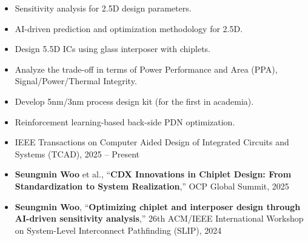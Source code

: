 \documentclass[10pt,letter,ragged2e]{altacv}
\begin{document}
\vspace{-5pt}
\divider
\vspace{-2.5pt}

\begin{itemize}
    \item Sensitivity analysis for 2.5D design parameters.
    \item AI-driven prediction and optimization methodology for 2.5D.
\end{itemize}

\vspace{-5pt}
\divider
\vspace{-2.5pt}

\begin{itemize}
    \item Design 5.5D ICs using glass interposer with chiplets.
    \item Analyze the trade-off in terms of Power Performance and Area (PPA), Signal/Power/Thermal Integrity.
\end{itemize}

\vspace{-5pt}
\divider
\vspace{-5pt}

\begin{itemize}
    \item Develop 5nm/3nm process design kit (for the first in academia).
    \item Reinforcement learning-based back-side PDN optimization.
\end{itemize}

\vspace{5pt}

\begin{itemize}
    \item IEEE Transactions on Computer Aided Design of Integrated Circuits and Systems (TCAD), 2025 -- Present
\end{itemize}
\begin{itemize}
    \item \textbf{Seungmin Woo} et al., “\textbf{CDX Innovations in Chiplet Design: From Standardization to System Realization},” OCP Global Summit, 2025
    \item \textbf{Seungmin Woo}, “\textbf{Optimizing chiplet and interposer design through AI-driven sensitivity analysis},” 26th ACM/IEEE International Workshop on System-Level Interconnect Pathfinding (SLIP), 2024
\end{itemize}
\end{document}
